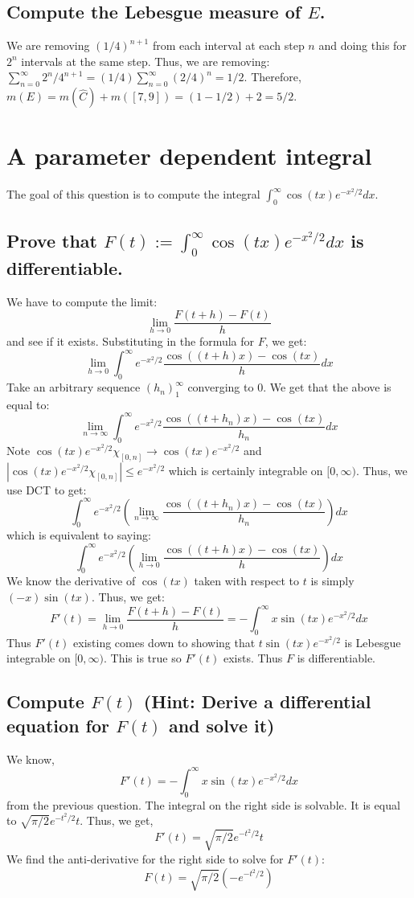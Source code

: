 \documentclass[11pt]{amsart}
\begin{document}
\subsection*{Compute the Lebesgue measure of $E$.} We are removing $(1/4)^{n+1}$ from each interval at each step $n$ and doing this for $2^n$ intervals at the same step.
Thus, we are removing: $\sum_{n=0}^{\infty} 2^n/4^{n+1} = (1/4)\sum_{n=0}^{\infty} (2/4)^n = 1/2$. Therefore, $m(E) = m(\hat{C}) + m([7,9]) = (1-1/2) + 2 = 5/2$.

\section{A parameter dependent integral}
The goal of this question is to compute the integral $\int_0^{\infty} \cos{(tx)}e^{-x^2/2}dx$.

\subsection*{Prove that $F(t) := \int_0^{\infty} \cos(tx)e^{-x^2/2}dx$ is differentiable.} We have to compute the limit:
\[ \lim_{h\to 0} \frac{F(t+h) - F(t)}{h} \]
and see if it exists. Substituting in the formula for $F$, we get:
\[ \lim_{h\to 0} \int_0^{\infty} e^{-x^2/2}\frac{\cos((t+h)x)-\cos(tx)}{h}dx \]
Take an arbitrary sequence $(h_n)_1^{\infty}$ converging to 0. We get that the above is equal to:
\[ \lim_{n\to\infty} \int_0^{\infty} e^{-x^2/2}\frac{\cos((t+h_n)x) - \cos(tx)}{h_n}dx \]
Note $\cos(tx)e^{-x^2/2}\chi_{[0,n]}\to  \cos(tx)e^{-x^2/2}$ and $|\cos(tx)e^{-x^2/2}\chi_{[0,n]}|\leq e^{-x^2/2}$ which is certainly integrable on $[0,\infty)$. Thus, we use DCT to get:
\[ \int_0^{\infty} e^{-x^2/2}(\lim_{n\to\infty} \frac{\cos((t+h_n)x) - \cos(tx)}{h_n})dx \]
which is equivalent to saying:
\[ \int_0^{\infty} e^{-x^2/2}(\lim_{h\to 0} \frac{\cos((t+h)x) - \cos(tx)}{h})dx \]
We know the derivative of $\cos(tx)$ taken with respect to $t$ is simply $(-x)\sin(tx)$. Thus, we get:
\[ F'(t) = \lim_{h\to 0} \frac{F(t+h) - F(t)}{h} = -\int_0^{\infty} x\sin(tx)e^{-x^2/2}dx \]
Thus $F'(t)$ existing comes down to showing that $t\sin(tx)e^{-x^2/2}$ is Lebesgue integrable on $[0,\infty)$. This is true so $F'(t)$ exists. Thus $F$ is differentiable.

\subsection*{Compute $F(t)$ (Hint: Derive a differential equation for $F(t)$ and solve it)}
We know,
\[ F'(t) = -\int_0^{\infty} x\sin(tx)e^{-x^2/2}dx \]
from the previous question. The integral on the right side is solvable. It is equal to $\sqrt{\pi/2}e^{-t^2/2}t$. Thus, we get,
\[ F'(t) = \sqrt{\pi/2}e^{-t^2/2}t \]
We find the anti-derivative for the right side to solve for $F'(t)$:
\[ F(t) = \sqrt{\pi/2} (-e^{-t^2/2}) \]
\end{document}
